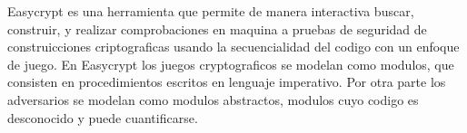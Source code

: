 \documentclass[runningheads]{llncs}
\begin{document}
Easycrypt es una herramienta que permite de manera interactiva buscar, construir, y realizar comprobaciones en maquina a pruebas de seguridad de construicciones criptograficas usando la secuencialidad del codigo con un enfoque de juego. En Easycrypt los juegos cryptograficos se modelan como modulos, que consisten en procedimientos escritos en lenguaje imperativo. Por otra parte los adversarios se modelan como modulos abstractos, modulos cuyo codigo es desconocido y puede cuantificarse.

%
%
\end{document}
